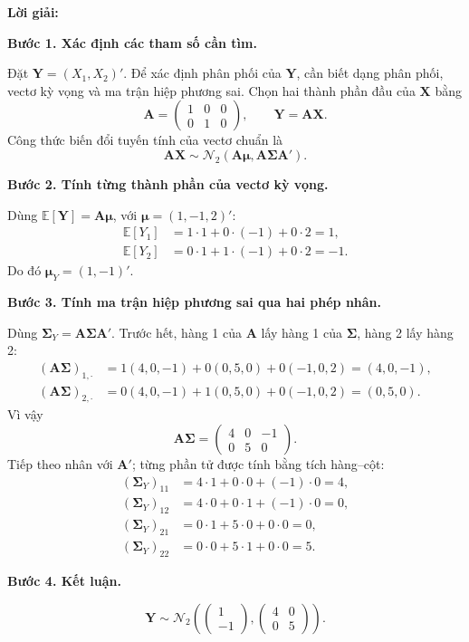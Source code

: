 \documentclass[11pt,a4paper]{article}
\renewcommand{\boldsymbol}[1]{\symbf{#1}}
\newenvironment{solution}{%
  \par\medskip\noindent\textbf{Lời giải:}\par\nopagebreak[4]\smallskip\noindent\ignorespaces
}{\par}
\newcommand{\answer}[1]{\boxed{#1}}
\newcommand{\step}[2]{\par\medskip\noindent\textbf{Bước #1. #2}\par\nopagebreak[4]\smallskip\noindent}
\begin{document}
\begin{solution}
\step{1}{Xác định các tham số cần tìm.}
Đặt $\mathbf{Y}=(X_1,X_2)'$. Để xác định phân phối của $\mathbf{Y}$,
cần biết dạng phân phối, vectơ kỳ vọng và ma trận hiệp phương sai.
Chọn hai thành phần đầu của $\mathbf{X}$ bằng
\[
\mathbf{A}=\begin{pmatrix}1&0&0\\0&1&0\end{pmatrix},\qquad
\mathbf{Y}=\mathbf{A}\mathbf{X}.
\]
Công thức biến đổi tuyến tính của vectơ chuẩn là
\[
\mathbf{A}\mathbf{X}\sim\mathcal{N}_2
(\mathbf{A}\boldsymbol{\mu},\mathbf{A}\boldsymbol{\Sigma}\mathbf{A}').
\]
\step{2}{Tính từng thành phần của vectơ kỳ vọng.}
Dùng $\mathbb{E}[\mathbf{Y}]=\mathbf{A}\boldsymbol{\mu}$, với
$\boldsymbol{\mu}=(1,-1,2)'$:
\begin{align*}
\mathbb{E}[Y_1]&=1\cdot1+0\cdot(-1)+0\cdot2=1,\\
\mathbb{E}[Y_2]&=0\cdot1+1\cdot(-1)+0\cdot2=-1.
\end{align*}
Do đó $\boldsymbol{\mu}_Y=(1,-1)'$.
\step{3}{Tính ma trận hiệp phương sai qua hai phép nhân.}
Dùng $\boldsymbol{\Sigma}_Y=\mathbf{A}\boldsymbol{\Sigma}\mathbf{A}'$.
Trước hết, hàng 1 của $\mathbf{A}$ lấy hàng 1 của $\boldsymbol{\Sigma}$,
hàng 2 lấy hàng 2:
\begin{align*}
(\mathbf{A}\boldsymbol{\Sigma})_{1,\cdot}
&=1(4,0,-1)+0(0,5,0)+0(-1,0,2)=(4,0,-1),\\
(\mathbf{A}\boldsymbol{\Sigma})_{2,\cdot}
&=0(4,0,-1)+1(0,5,0)+0(-1,0,2)=(0,5,0).
\end{align*}
Vì vậy
\[
\mathbf{A}\boldsymbol{\Sigma}=\begin{pmatrix}4&0&-1\\0&5&0\end{pmatrix}.
\]
Tiếp theo nhân với $\mathbf{A}'$; từng phần tử được tính bằng tích hàng--cột:
\begin{align*}
(\boldsymbol{\Sigma}_Y)_{11}&=4\cdot1+0\cdot0+(-1)\cdot0=4,\\
(\boldsymbol{\Sigma}_Y)_{12}&=4\cdot0+0\cdot1+(-1)\cdot0=0,\\
(\boldsymbol{\Sigma}_Y)_{21}&=0\cdot1+5\cdot0+0\cdot0=0,\\
(\boldsymbol{\Sigma}_Y)_{22}&=0\cdot0+5\cdot1+0\cdot0=5.
\end{align*}
\step{4}{Kết luận.}
\[
\mathbf{Y}\sim\answer{\mathcal{N}_2\left(
\begin{pmatrix}1\\-1\end{pmatrix},
\begin{pmatrix}4&0\\0&5\end{pmatrix}\right)}.
\]
\end{solution}
\end{document}
